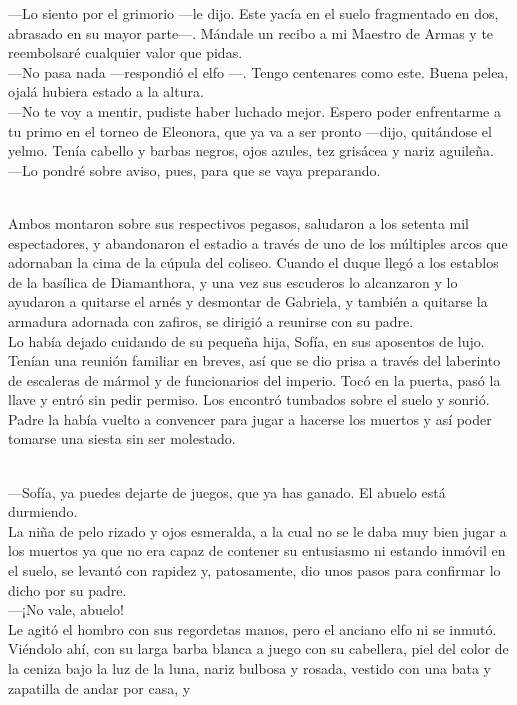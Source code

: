 \documentclass[
  letterpaper,
]{krantz}
\begin{document}
---Lo siento por el grimorio ---le dijo. Este yacía en el suelo
fragmentado en dos, abrasado en su mayor parte---. Mándale un recibo a
mi Maestro de Armas y te reembolsaré cualquier valor que pidas.\\
---No pasa nada ---respondió el elfo ---. Tengo centenares como este.
Buena pelea, ojalá hubiera estado a la altura.\\
---No te voy a mentir, pudiste haber luchado mejor. Espero poder
enfrentarme a tu primo en el torneo de Eleonora, que ya va a ser pronto
---dijo, quitándose el yelmo. Tenía cabello y barbas negros, ojos
azules, tez grisácea y nariz aguileña.\\
---Lo pondré sobre aviso, pues, para que se vaya preparando.\\
\strut \\
Ambos montaron sobre sus respectivos pegasos, saludaron a los setenta
mil espectadores, y abandonaron el estadio a través de uno de los
múltiples arcos que adornaban la cima de la cúpula del coliseo. Cuando
el duque llegó a los establos de la basílica de Diamanthora, y una vez
sus escuderos lo alcanzaron y lo ayudaron a quitarse el arnés y
desmontar de Gabriela, y también a quitarse la armadura adornada con
zafiros, se dirigió a reunirse con su padre.\\
Lo había dejado cuidando de su pequeña hija, Sofía, en sus aposentos de
lujo. Tenían una reunión familiar en breves, así que se dio prisa a
través del laberinto de escaleras de mármol y de funcionarios del
imperio. Tocó en la puerta, pasó la llave y entró sin pedir permiso. Los
encontró tumbados sobre el suelo y sonrió. Padre la había vuelto a
convencer para jugar a hacerse los muertos y así poder tomarse una
siesta sin ser molestado.\\
\strut \\
---Sofía, ya puedes dejarte de juegos, que ya has ganado. El abuelo está
durmiendo.\\
La niña de pelo rizado y ojos esmeralda, a la cual no se le daba muy
bien jugar a los muertos ya que no era capaz de contener su entusiasmo
ni estando inmóvil en el suelo, se levantó con rapidez y, patosamente,
dio unos pasos para confirmar lo dicho por su padre.\\
---¡No vale, abuelo!\\
Le agitó el hombro con sus regordetas manos, pero el anciano elfo ni se
inmutó. Viéndolo ahí, con su larga barba blanca a juego con su
cabellera, piel del color de la ceniza bajo la luz de la luna, nariz
bulbosa y rosada, vestido con una bata y zapatilla de andar por casa, y
\end{document}
